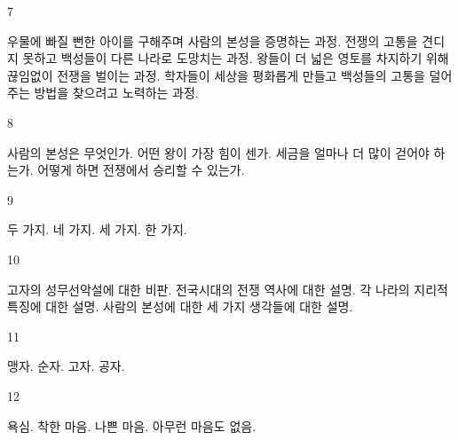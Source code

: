 \documentclass[fs9,seriesFre]{korfarm-base}
\begin{document}
\begin{kfSentenceUnit}{7}{}
\begin{kfChoices}
\kfChoice 우물에 빠질 뻔한 아이를 구해주며 사람의 본성을 증명하는 과정.
\kfChoice 전쟁의 고통을 견디지 못하고 백성들이 다른 나라로 도망치는 과정.
\kfChoice 왕들이 더 넓은 영토를 차지하기 위해 끊임없이 전쟁을 벌이는 과정.
\kfChoice 학자들이 세상을 평화롭게 만들고 백성들의 고통을 덜어주는 방법을 찾으려고 노력하는 과정.
\end{kfChoices}
\end{kfSentenceUnit}

\begin{kfSentenceUnit}{8}{}
\begin{kfChoices}
\kfChoice 사람의 본성은 무엇인가.
\kfChoice 어떤 왕이 가장 힘이 센가.
\kfChoice 세금을 얼마나 더 많이 걷어야 하는가.
\kfChoice 어떻게 하면 전쟁에서 승리할 수 있는가.
\end{kfChoices}
\end{kfSentenceUnit}

\begin{kfSentenceUnit}{9}{}
\begin{kfChoices}
\kfChoice 두 가지.
\kfChoice 네 가지.
\kfChoice 세 가지.
\kfChoice 한 가지.
\end{kfChoices}
\end{kfSentenceUnit}

\begin{kfSentenceUnit}{10}{}
\begin{kfChoices}
\kfChoice 고자의 성무선악설에 대한 비판.
\kfChoice 전국시대의 전쟁 역사에 대한 설명.
\kfChoice 각 나라의 지리적 특징에 대한 설명.
\kfChoice 사람의 본성에 대한 세 가지 생각들에 대한 설명.
\end{kfChoices}
\end{kfSentenceUnit}

\begin{kfSentenceUnit}{11}{}
\begin{kfChoices}
\kfChoice 맹자.
\kfChoice 순자.
\kfChoice 고자.
\kfChoice 공자.
\end{kfChoices}
\end{kfSentenceUnit}

\begin{kfSentenceUnit}{12}{}
\begin{kfChoices}
\kfChoice 욕심.
\kfChoice 착한 마음.
\kfChoice 나쁜 마음.
\kfChoice 아무런 마음도 없음.
\end{kfChoices}
\end{kfSentenceUnit}
\end{document}

